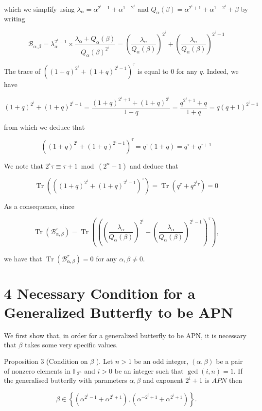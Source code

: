 \documentclass[10pt]{article}
\begin{document}
which we simplify using $\lambda_{\alpha}=\alpha^{2^{i}-1}+\alpha^{1-2^{i}}$ and $Q_{\alpha}(\beta)=\alpha^{2^{i}+1}+\alpha^{1-2^{i}}+\beta$ by writing

$$
\mathcal{B}_{\alpha, \beta}=\lambda_{\alpha}^{2^{i}-1} \times \frac{\lambda_{\alpha}+Q_{\alpha}(\beta)}{Q_{\alpha}(\beta)^{2^{i}}}=\left(\frac{\lambda_{\alpha}}{Q_{\alpha}(\beta)}\right)^{2^{i}}+\left(\frac{\lambda_{\alpha}}{Q_{\alpha}(\beta)}\right)^{2^{i}-1}
$$

The trace of $\left((1+q)^{2^{i}}+(1+q)^{2^{i}-1}\right)^{\tau}$ is equal to 0 for any $q$. Indeed, we have

$$
(1+q)^{2^{i}}+(1+q)^{2^{i}-1}=\frac{(1+q)^{2^{i}+1}+(1+q)^{2^{i}}}{1+q}=\frac{q^{2^{i}+1}+q}{1+q}=q(q+1)^{2^{i}-1}
$$

from which we deduce that

$$
\left((1+q)^{2^{i}}+(1+q)^{2^{i}-1}\right)^{\tau}=q^{\tau}(1+q)=q^{\tau}+q^{\tau+1}
$$

We note that $2^{i} \tau \equiv \tau+1 \bmod \left(2^{n}-1\right)$ and deduce that

$$
\operatorname{Tr}\left(\left((1+q)^{2^{i}}+(1+q)^{2^{i}-1}\right)^{\tau}\right)=\operatorname{Tr}\left(q^{\tau}+q^{2^{i} \tau}\right)=0
$$

As a consequence, since

$$
\operatorname{Tr}\left(\mathcal{B}_{\alpha, \beta}^{\tau}\right)=\operatorname{Tr}\left(\left(\left(\frac{\lambda_{\alpha}}{Q_{\alpha}(\beta)}\right)^{2^{i}}+\left(\frac{\lambda_{\alpha}}{Q_{\alpha}(\beta)}\right)^{2^{i}-1}\right)^{\tau}\right),
$$

we have that $\operatorname{Tr}\left(\mathcal{B}_{\alpha, \beta}^{\tau}\right)=0$ for any $\alpha, \beta \neq 0$.

\section*{4 Necessary Condition for a Generalized Butterfly to be APN}
We first show that, in order for a generalized butterfly to be APN, it is necessary that $\beta$ takes some very specific values.

Proposition 3 (Condition on $\beta$ ). Let $n>1$ be an odd integer, $(\alpha, \beta)$ be a pair of nonzero elements in $\mathbb{F}_{2^{n}}$ and $i>0$ be an integer such that $\operatorname{gcd}(i, n)=1$. If the generalised butterfly with parameters $\alpha, \beta$ and exponent $2^{i}+1$ is $A P N$ then

$$
\beta \in\left\{\left(\alpha^{2^{i}-1}+\alpha^{2^{i}+1}\right),\left(\alpha^{-2^{i}+1}+\alpha^{2^{i}+1}\right)\right\} .
$$
\end{document}
